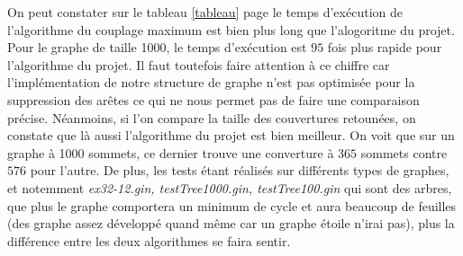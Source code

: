  On peut constater sur le tableau \ref{tableau} page \pageref{tableau}
  le temps d'exécution de l'algorithme du couplage maximum est bien plus
  long que l'alogoritme du projet. Pour le graphe de taille 1000, le
  temps d'exécution est $95$ fois plus rapide pour l'algorithme du
  projet. Il faut toutefois faire attention à ce chiffre car
  l'implémentation de notre structure de graphe n'est pas optimisée pour
  la suppression des arêtes ce qui ne nous permet pas de faire une
  comparaison précise.\newline
  \indent Néanmoins, si l'on compare la taille des couvertures
  retounées, on constate que là aussi l'algorithme du projet est bien
  meilleur. On voit que sur un graphe à 1000 sommets, ce dernier trouve
  une converture à $365$ sommets contre $576$ pour l'autre. De plus, les
  tests étant réalisés sur différents types de graphes, et notemment
  \emph{ex32-12.gin, testTree1000.gin, testTree100.gin} qui sont des
  arbres, que plus le graphe comportera un minimum de cycle et aura
  beaucoup de feuilles (des graphe assez développé quand même car un
  graphe étoile n'irai pas), plus la différence entre les deux
  algorithmes se faira sentir. 